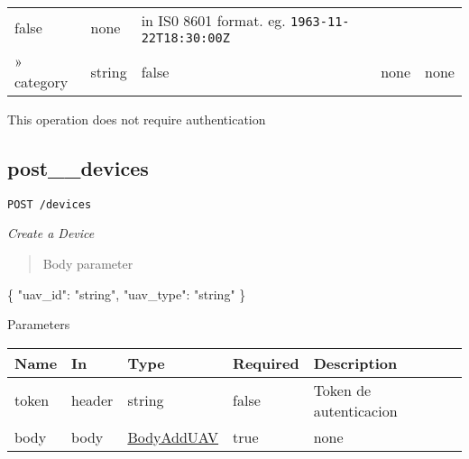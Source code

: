 \documentclass[
]{article}
\newenvironment{Shaded}{}{}
\newcommand{\DataTypeTok}[1]{\textcolor[rgb]{0.56,0.13,0.00}{#1}}
\newcommand{\FunctionTok}[1]{\textcolor[rgb]{0.02,0.16,0.49}{#1}}
\newcommand{\StringTok}[1]{\textcolor[rgb]{0.25,0.44,0.63}{#1}}
\begin{document}
\begin{longtable}[]{@{}lllll@{}}
\begin{minipage}[t]{0.17\columnwidth}
false\strut
\end{minipage} & \begin{minipage}[t]{0.17\columnwidth}\raggedright
none\strut
\end{minipage} & \begin{minipage}[t]{0.17\columnwidth}\raggedright
in IS0 8601 format. eg. \texttt{1963-11-22T18:30:00Z}\strut
\end{minipage}\tabularnewline
\begin{minipage}[t]{0.17\columnwidth}\raggedright
» category\strut
\end{minipage} & \begin{minipage}[t]{0.17\columnwidth}\raggedright
string\strut
\end{minipage} & \begin{minipage}[t]{0.17\columnwidth}\raggedright
false\strut
\end{minipage} & \begin{minipage}[t]{0.17\columnwidth}\raggedright
none\strut
\end{minipage} & \begin{minipage}[t]{0.17\columnwidth}\raggedright
none\strut
\end{minipage}\tabularnewline
\bottomrule
\end{longtable}

This operation does not require authentication

\hypertarget{post__devices}{%
\subsection{post\_\_devices}\label{post__devices}}

\texttt{POST\ /devices}

\emph{Create a Device}

\begin{quote}
Body parameter
\end{quote}

\begin{Shaded}
\begin{Highlighting}[]
\FunctionTok{\{}
  \DataTypeTok{"uav\_id"}\FunctionTok{:} \StringTok{"string"}\FunctionTok{,}
  \DataTypeTok{"uav\_type"}\FunctionTok{:} \StringTok{"string"}
\FunctionTok{\}}
\end{Highlighting}
\end{Shaded}

Parameters

\begin{longtable}[]{@{}lllll@{}}
\toprule
Name & In & Type & Required & Description\tabularnewline
\midrule
\endhead
token & header & string & false & Token de autenticacion\tabularnewline
body & body & \protect\hyperlink{schemabodyadduav}{BodyAddUAV} & true &
none\tabularnewline
\bottomrule
\end{longtable}
\end{document}

